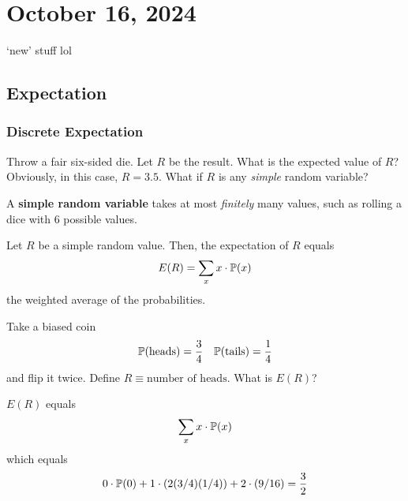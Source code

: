 \section{October 16, 2024}
`new' stuff lol

\subsection{Expectation}

\subsubsection{Discrete Expectation}

Throw a fair six-sided die. Let $R$ be the result. What is the expected value of $R$? Obviously, in this case, $R = 3.5$. What if $R$ is any \textit{simple} random variable?

\begin{definition}
    A \textbf{simple random variable} takes at most \textit{finitely} many values, such as rolling a dice with $6$ possible values.
\end{definition}

\begin{definition}
    Let $R$ be a simple random value. Then, the expectation of $R$ equals
    \begin{align}
        E(R) = \sum_x x \cdot \mathbb{P}(x)
    \end{align}
    the weighted average of the probabilities.
\end{definition}

\begin{example}
    Take a biased coin
    \begin{align}
        \mathbb{P}(\text{heads}) = \frac{3}{4} && \mathbb{P}(\text{tails}) = \frac{1}{4}
    \end{align}
    and flip it twice. Define $R \equiv \text{number of heads}$. What is $E(R)$?
\end{example}
\begin{solution}
    $E(R)$ equals
    \begin{align}
        \sum_x x \cdot \mathbb{P}(x)
    \end{align}
    which equals
    \begin{align}
        0 \cdot \mathbb{P}(0) + 1 \cdot (2(3/4)(1/4)) + 2 \cdot (9/16) = \frac{3}{2}
    \end{align}
\end{solution}

